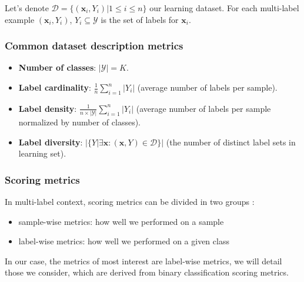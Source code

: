 Let's denote $\mathcal{D} = \{(\mathbf{x}_i, Y_i) | 1 \leq i \leq n\}$ our learning dataset. For each multi-label example $(\mathbf{x}_i, Y_i)$, $Y_i \subseteq \mathcal{Y}$ is the set of labels for $\mathbf{x}_i$.

\subsubsection{Common dataset description metrics}

\begin{itemize}
	\item \textbf{Number of classes}: $|\mathcal{Y}| = K$.
	\item \textbf{Label cardinality}: $\frac{1}{n}\sum_{i=1}^n |Y_i|$ (average number of labels per sample).
	\item \textbf{Label density}: $\frac{1}{n \times |\mathcal{Y}|}\sum_{i=1}^n |Y_i|$ (average number of labels per sample normalized by number of classes).
	\item \textbf{Label diversity}: $|\{Y | \exists \mathbf{x}:(\mathbf{x}, Y) \in \mathcal{D}\}|$ (the number of distinct label sets in learning set).
\end{itemize}


\subsubsection{Scoring metrics}

In multi-label context, scoring metrics can be divided in two groups \cite{MultilabelReview}: 
\begin{itemize}
	\item sample-wise metrics: how well we performed on a sample
	\item label-wise metrics: how well we performed on a given class
\end{itemize}

In our case, the metrics of most interest are label-wise metrics, we will detail those we consider, which are derived from binary classification scoring metrics.  

